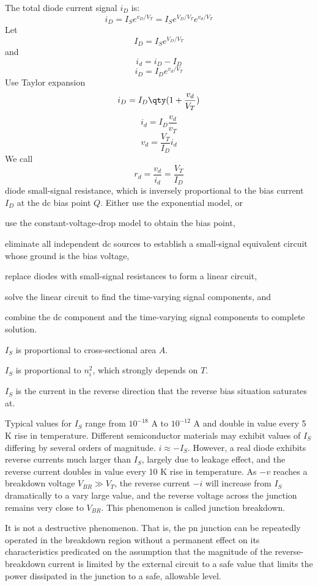 \documentclass[a4paper,12pt]{report}
\begin{document}
The total diode current signal $i_D$ is:
\[i_D=I_Se^{v_D/V_T}=I_Se^{V_D/V_T}e^{v_d/V_T}\]
Let
\[I_D=I_Se^{V_D/V_T}\]
and
\[i_d=i_D-I_D\]
\[i_D=I_De^{v_d/V_T}\]
Use Taylor expansion
\[i_D=I_D\qty(1+\frac{v_d}{V_T})\]
\[i_d=I_D\frac{v_d}{v_T}\]
\[v_d=\frac{V_T}{I_D}i_d\]
We call
\[r_d=\frac{v_d}{i_d}=\frac{V_T}{I_D}\]
diode small-signal resistance, which is inversely proportional to the bias current $I_D$ at the dc bias point $Q$.
Either use the exponential model, or
\bit
\item use the constant-voltage-drop model to obtain the bias point,
\item eliminate all independent dc sources to establish a small-signal equivalent circuit whose ground is the bias voltage,
\item replace diodes with small-signal resistances to form a linear circuit,
\item solve the linear circuit to find the time-varying signal components, and
\item combine the dc component and the time-varying signal components to complete solution.
\eit
{}
\bit
\item $I_S$ is proportional to cross-sectional area $A$.
\item $I_S$ is proportional to $n_i^2$, which strongly depends on $T$.
\item $I_S$ is the current in the reverse direction that the reverse bias situation saturates at.
\item Typical values for $I_S$ range from $10^{-18}$ A to $10^{-12}$ A and double in value every 5 K rise in temperature. Different semiconductor materials may exhibit values of $I_S$ differing by several orders of magnitude.
\eit
{}
$i\approx-I_S$. However, a real diode exhibits reverse currents much larger than $I_S$, largely due to leakage effect, and the reverse current doubles in value every 10 K rise in temperature.
As $-v$ reaches a breakdown voltage $V_{BR}\gg V_T$, the reverse current $-i$ will increase from $I_S$ dramatically to a vary large value, and the reverse voltage across the junction remains very close to $V_{BR}$. This phenomenon is called junction breakdown.

It is not a destructive phenomenon. That is, the pn junction can be repeatedly operated in the breakdown region without a permanent effect on its characteristics predicated on the assumption that the magnitude of the reverse-breakdown current is limited by the external circuit to a safe value that limits the power dissipated in the junction to a safe, allowable level.
\end{document}
